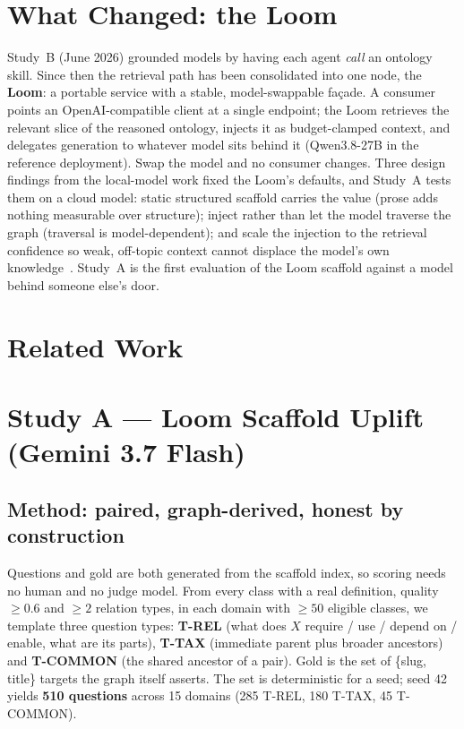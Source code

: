 \documentclass[11pt]{article}
\begin{document}
\section{What Changed: the Loom}
Study~B (June 2026) grounded models by having each agent \emph{call} an ontology skill.
Since then the retrieval path has been consolidated into one node, the \textbf{Loom}: a portable
service with a stable, model-swappable façade. A consumer points an OpenAI-compatible client at a
single endpoint; the Loom retrieves the relevant slice of the reasoned ontology, injects it as
budget-clamped context, and delegates generation to whatever model sits behind it (Qwen3.8-27B in
the reference deployment). Swap the model and no consumer changes. Three design findings from the
local-model work fixed the Loom's defaults, and Study~A tests them on a cloud model:
static structured scaffold carries the value (prose adds nothing measurable over structure);
inject rather than let the model traverse the graph (traversal is model-dependent); and scale the
injection to the retrieval confidence so weak, off-topic context cannot displace the model's own
knowledge~\cite{lin2026interference,yoran2024robust,shi2023large}. Study~A is the first evaluation
of the Loom scaffold against a model behind someone else's door.

\section{Related Work}


\section{Study A --- Loom Scaffold Uplift (Gemini 3.7 Flash)}

\subsection{Method: paired, graph-derived, honest by construction}
Questions and gold are both generated from the scaffold index, so scoring needs no human and no
judge model. From every class with a real definition, quality $\geq 0.6$ and $\geq 2$ relation
types, in each domain with $\geq 50$ eligible classes, we template three question types:
\textbf{T-REL} (what does $X$ require / use / depend on / enable, what are its parts),
\textbf{T-TAX} (immediate parent plus broader ancestors) and \textbf{T-COMMON} (the shared
ancestor of a pair). Gold is the set of \{slug, title\} targets the graph itself asserts. The set
is deterministic for a seed; seed 42 yields \textbf{510 questions} across 15 domains (285 T-REL,
180 T-TAX, 45 T-COMMON).
\end{document}
